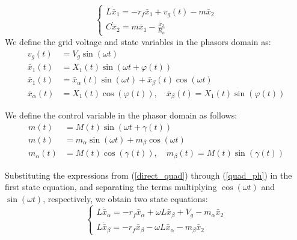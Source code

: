 \documentclass[DIV=calc, paper=a4, fontsize=11pt, twocolumn]{scrartcl}	 %
\begin{document}

\begin{equation}
    \begin{cases} 
        L \dot{\bar{x}}_1 = -r_f \bar{x}_1 + v_g(t) - m\bar{x}_2 \\[8pt]
        C \dot{\bar{x}}_2 = m\bar{x}_1 - \frac{\bar{x}_2}{R_o}
    \end{cases}
\end{equation}
We define the grid voltage and state variables in the phasors domain as:
{\small
\begin{align}\label{direct_quad}
    v_g(t) &= V_{g} \sin(\omega t) \\
    \bar{x}_1(t) &= X_1(t) \sin(\omega t + \varphi(t)) \\ \bar{x}_1(t) &= \bar{x}_\alpha(t) \sin(\omega t) + \bar{x}_\beta(t) \cos(\omega t) \\
    \bar{x}_\alpha(t) &= X_1(t) \cos(\varphi(t)), \quad \bar{x}_\beta(t) = X_1(t) \sin(\varphi(t))
\end{align}
}

We define the control variable in the phasor domain as follows:
{\small
\begin{align}
    m(t) &= M(t) \sin(\omega t + \gamma(t)) \\ m(t)&= m_\alpha \sin(\omega t) + m_\beta \cos(\omega t) \\
    m_\alpha(t) &= M(t) \cos(\gamma(t)), \quad m_\beta(t) = M(t) \sin(\gamma(t))\label{quad_ph}
\end{align}
}

Substituting the expressions from (\ref{direct_quad}) through (\ref{quad_ph}) in the first state equation, and separating the terms multiplying $\cos(\omega t)$ and $\sin(\omega t)$, respectively, we obtain two state equations:
\begin{equation}
    \begin{cases} 
        L \dot{\bar{x}}_\alpha = -r_f \bar{x}_\alpha + \omega L \bar{x}_\beta + V_g - m_\alpha \bar{x}_2 \\[8pt]
        L \dot{\bar{x}}_\beta = -r_f \bar{x}_\beta - \omega L \bar{x}_\alpha - m_\beta \bar{x}_2
    \end{cases}
\end{equation}
\end{document}
